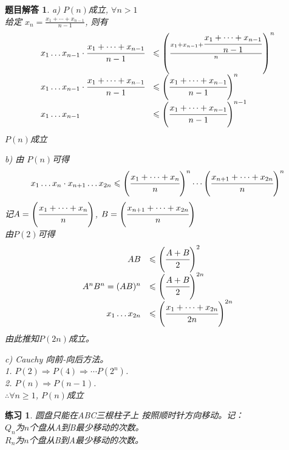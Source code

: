 \documentclass[mode=geye]{elegantnote}
\newtheorem{exercise}{练习}
\newtheorem{answer}{题目解答}
\begin{document}
\begin{answer}
	a) $ P(n) $成立, $ \forall n>1 $\\
	给定 $ x_n = \frac{x_{1}+\cdots+x_{n-1}}{n-1} $, 则有
	\begin{equation*}
		\begin{array}{ll}
			x_1 \dots x_{n-1} \cdot \cfrac{x_{1}+\dots+x_{n-1}}{n-1} 
			&\leqslant \left( \frac{	x_1 + x_{n-1} + \cfrac{x_{1}+\dots+x_{n-1}}{n-1} }{n} \right) ^n \\
			x_1 \dots x_{n-1} \cdot \cfrac{x_{1}+\dots+x_{n-1}}{n-1}
			&\leqslant \left(  \cfrac{x_{1}+\dots+x_{n-1}}{n-1} \right) ^n \\
			x_1 \dots x_{n-1}
			&\leqslant \left(  \cfrac{x_{1}+\dots+x_{n-1}}{n-1} \right) ^{n-1}\\
		\end{array}
	\end{equation*}
	$ P(n) $成立
	
	b) 由 $ P(n) $可得
	\begin{equation*}
		x_{1} \dots x_{n} \cdot x_{n+1} \dots x_{2n} \leqslant \left(\cfrac{x_{1} + \dots + x_{n}}{n}\right)^n \cdots \left(\cfrac{x_{n+1} + \dots + x_{2n}}{n}\right)^n
	\end{equation*}
	记$ A = \left(\cfrac{x_{1} + \dots + x_{n}}{n}\right) $,  $ B = \left(\cfrac{x_{n+1} + \dots + x_{2n}}{n}\right) $\\
	由$ P(2) $可得
	\begin{equation*}
		\begin{array}{rl}
			AB &\leqslant \left(\cfrac{A+B}{2}\right)^{2}  \\
			A^{n} B^{n} = (AB)^{n} &\leqslant \left(\cfrac{A+B}{2}\right)^{2n} \\
			x_{1}\dots x_{2n} &\leqslant \left(\cfrac{x_{1}+\dots +x_{2n}}{2n}\right)^{2n} \\
		\end{array}
	\end{equation*}
	由此推知$ P(2n) $成立。
	
	c) Cauchy 向前-向后方法。\\
	1. $ P(2)\Rightarrow P(4)\Rightarrow\cdots P(2^n) $. \\
	2. $ P(n)\Rightarrow P(n-1) $.\\
	$ \therefore \forall n\geqslant 1 $, $ P(n) $成立
\end{answer}

\begin{exercise}
	圆盘只能在ABC三根柱子上 按照顺时针方向移动。记：\\
	$ Q_{n} $为$ n $个盘从A到B最少移动的次数。\\
	$ R_{n} $为$ n $个盘从B到A最少移动的次数。	
\end{exercise}
\end{document}
